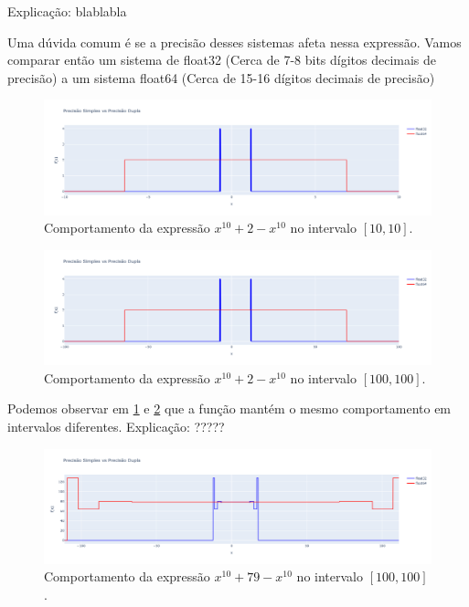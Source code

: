 Explicação: blablabla

Uma dúvida comum é se a precisão desses sistemas afeta nessa expressão. Vamos comparar então um sistema de float32 (Cerca de 7-8 bits dígitos decimais de precisão) a um sistema float64
(Cerca de 15-16  dígitos decimais de precisão)
\begin{figure}[h]
    \centering 
    \includegraphics[width=1\textwidth]{Imagens/32x64_full.png}
    \caption{Comportamento da expressão \(x^{10} + 2 - x^{10}\) no intervalo \([10, 10]\).}
    \label{fig:32x64_full}
\end{figure}

\begin{figure}[h]
    \centering 
    \includegraphics[width=1\textwidth]{Imagens/32x64_full_2.png}
    \caption{Comportamento da expressão \(x^{10} + 2 - x^{10}\) no intervalo \([100, 100]\).}
    \label{fig:32x64_full_2}
\end{figure}

Podemos observar em \ref{fig:32x64_full} e \ref{fig:32x64_full_2} que a função mantém o mesmo comportamento em intervalos diferentes.
Explicação: ?????

\begin{figure}[h]
    \centering 
    \includegraphics[width=1\textwidth]{Imagens/32x64_full_diffent_extrems.png}
    \caption{Comportamento da expressão \(x^{10} + 79 - x^{10}\) no intervalo \([100, 100]\).}
    \label{fig:32x64_full_diffent_extrems}
\end{figure}

